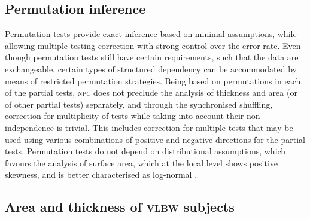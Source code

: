 \subsection{Permutation inference}

Permutation tests provide exact inference based on minimal assumptions, while allowing multiple testing correction with strong control over the error rate. Even though permutation tests still have certain requirements, such that the data are exchangeable, certain types of structured dependency can be accommodated by means of restricted permutation strategies. Being based on permutations in each of the partial tests, \textsc{npc} does not preclude the analysis of thickness and area (or of other partial tests) separately, and through the synchronised shuffling, correction for multiplicity of tests while taking into account their non-independence is trivial. This includes correction for multiple tests that may be used using various combinations of positive and negative directions for the partial tests. Permutation tests do not depend on distributional assumptions, which favours the analysis of surface area, which at the local level shows positive skewness, and is better characterised as log-normal \citep{Winkler2012}.  

\subsection{Area and thickness of \textsc{vlbw} subjects}

